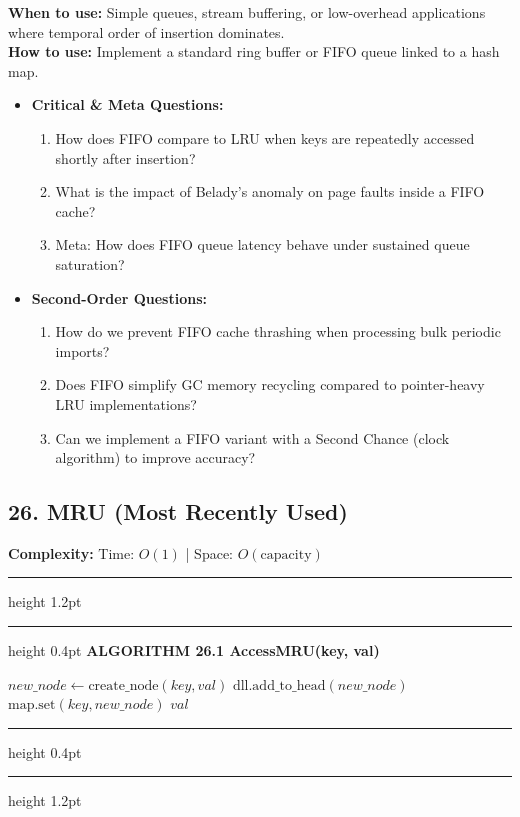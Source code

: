 \documentclass[11pt,a4paper]{article}
\newenvironment{textbookalgo}[2]{%
  \par\addvspace{1.2em}\noindent
  \hrule height 1.2pt
  \vspace{1.5pt}
  \hrule height 0.4pt
  \vspace{5pt}
  {\noindent\large\bfseries\sffamily ALGORITHM #1 \quad #2}
  \par\vspace{5pt}
  \RestyleAlgo{plain}
}{%
  \par\vspace{4pt}
  \hrule height 0.4pt
  \vspace{1.5pt}
  \hrule height 1.2pt
  \par\addvspace{1.2em}
}
\theoremstyle{definition}
\begin{document}
\noindent
\textbf{When to use:} Simple queues, stream buffering, or low-overhead applications where temporal order of insertion dominates.\\
\textbf{How to use:} Implement a standard ring buffer or FIFO queue linked to a hash map.
\begin{itemize}[leftmargin=*]
  \item[] \textbf{Critical \& Meta Questions:}
  \begin{enumerate}
    \item How does FIFO compare to LRU when keys are repeatedly accessed shortly after insertion?
    \item What is the impact of Belady's anomaly on page faults inside a FIFO cache?
    \item Meta: How does FIFO queue latency behave under sustained queue saturation?
  \end{enumerate}
  \item[] \textbf{Second-Order Questions:}
  \begin{enumerate}
    \item How do we prevent FIFO cache thrashing when processing bulk periodic imports?
    \item Does FIFO simplify GC memory recycling compared to pointer-heavy LRU implementations?
    \item Can we implement a FIFO variant with a Second Chance (clock algorithm) to improve accuracy?
  \end{enumerate}
\end{itemize}
\medskip


\clearpage
\subsection{26. MRU (Most Recently Used)}

\noindent
\textbf{Complexity:} Time: $O(1)$ | Space: $O(\text{capacity})$
\smallskip

\begin{textbookalgo}{26.1}{AccessMRU(key, val)}
\begin{algorithm}[H]
$new\_node \leftarrow \text{create\_node}(key, val)$\;
$\text{dll.add\_to\_head}(new\_node)$\;
$\text{map.set}(key, new\_node)$\;
\Return $val$\;
\end{algorithm}
\end{textbookalgo}
\end{document}
